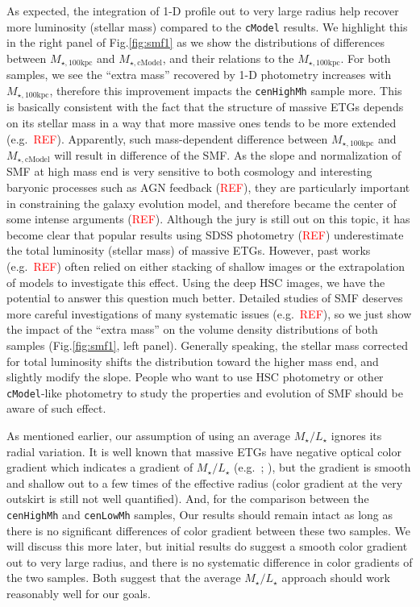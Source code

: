 \documentclass{emulateapj}
\def\cmodel{\texttt{cModel}}
\def\rbcg{\texttt{cenHighMh}}
\def\nbcg{\texttt{cenLowMh}}
\def\mtot{{$M_{\star,100\mathrm{kpc}}$}}
\def\mcmodel{{$M_{\star,\mathrm{cModel}}$}}
\def\m2l{{$M_{\star}/L_{\star}$}}
\newcommand{\addref}{{\textcolor{red}{REF}}}
\begin{document}
\begin{CJK*}{UTF8}{gbsn}
    As expected, the integration of 1-D profile out to very large radius help 
    recover more luminosity (stellar mass) compared to the \cmodel{} results.
    We highlight this in the right panel of Fig.\ref{fig:smf1} as we show the 
    distributions of differences between \mtot{} and \mcmodel{}, and their relations 
    to the \mtot{}.  
    For both samples, we see the ``extra mass'' recovered by 1-D photometry 
    increases with \mtot{}, therefore this improvement impacts the \rbcg{}
    sample more.  
    This is basically consistent with the fact that the structure of massive ETGs 
    depends on its stellar mass in a way that more massive ones tends to be 
    more extended (e.g.\ \addref).  
    Apparently, such mass-dependent difference between \mtot{} and \mcmodel{} will 
    result in difference of the SMF. 
    As the slope and normalization of SMF at high mass end is very sensitive 
    to both cosmology and interesting baryonic processes such as AGN feedback
    (\addref), they are particularly important in constraining the galaxy evolution
    model, and therefore became the center of some intense arguments (\addref).  
    Although the jury is still out on this topic, it has become clear that 
    popular results using SDSS photometry (\addref) underestimate the total 
    luminosity (stellar mass) of massive ETGs.  
    However, past works (e.g.\ \addref) often relied on either stacking of 
    shallow images or the extrapolation of models to investigate this effect. 
    Using the deep HSC images, we have the potential to answer this question 
    much better. 
    Detailed studies of SMF deserves more careful investigations of many 
    systematic issues (e.g.\ \addref), so we just show the impact of the 
    ``extra mass'' on the volume density distributions of both samples 
    (Fig.\ref{fig:smf1}, left panel).  
    Generally speaking, the stellar mass corrected for total luminosity 
    shifts the distribution toward the higher mass end, and slightly modify
    the slope. 
    People who want to use HSC photometry or other \cmodel{}-like photometry to 
    study the properties and evolution of SMF should be aware of such effect.
        
    As mentioned earlier, our assumption of using an average \m2l{} ignores its
    radial variation.   
    It is well known that massive ETGs have negative optical color gradient which 
    indicates a gradient of \m2l{} (e.g.\ \citealt{LaBarbera2012}; \citealt{DSouza2015}),
    but the gradient is smooth and shallow out to a few times of the effective 
    radius (color gradient at the very outskirt is still not well quantified). 
    And, for the comparison between the \rbcg{} and \nbcg{} samples, 
    Our results should remain intact as long as there is no significant
    differences of color gradient between these two samples.
    We will discuss this more later, but initial results do suggest a smooth color
    gradient out to very large radius, and there is no systematic difference in 
    color gradients of the two samples.  
    Both suggest that the average \m2l{} approach should work reasonably well for
    our goals.
    

\end{CJK*}
\end{document}

